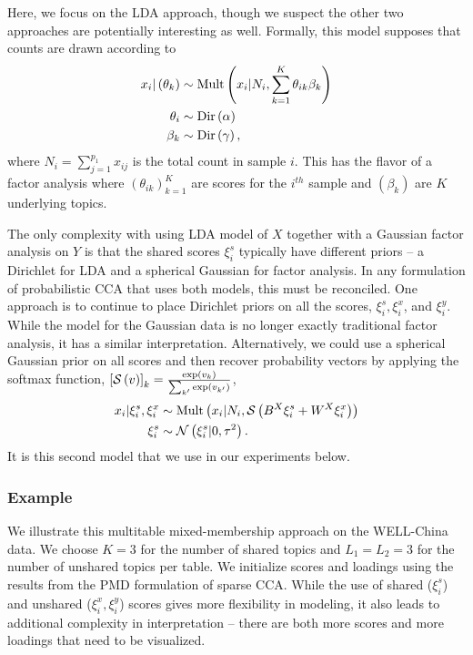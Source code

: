 \documentclass[14pt]{extarticle}
\begin{document}
Here, we focus on the LDA approach, though we suspect the other two approaches
are potentially interesting as well. Formally, this model supposes that counts
are drawn according to
\begin{align*}
  x_{i} \vert \left(\theta_{k}\right) &\sim \textnormal{Mult}\left(x_{i} \vert N_{i},
  \sum_{k = 1}^{K} \theta_{ik} \beta_{k}\right) \\
  \theta_{i} &\sim \textnormal{Dir}\left(\alpha\right)\\
  \beta_k &\sim \textnormal{Dir}\left(\gamma\right),
\end{align*}
where $N_i = \sum_{j = 1}^{p_1} x_{ij}$ is the total count in sample $i$. This
has the flavor of a factor analysis where $\left(\theta_{ik}\right)_{k =1}^{K}$
are scores for the $i^{th}$ sample and $\left(\beta_{k}\right)$ are $K$
underlying topics.

The only complexity with using LDA model of $X$ together with a Gaussian factor
analysis on $Y$ is that the shared scores $\xi_{i}^{s}$ typically have different
priors -- a Dirichlet for LDA and a spherical Gaussian for factor analysis. In
any formulation of probabilistic CCA that uses both models, this must be
reconciled. One approach is to continue to place Dirichlet priors on all the
scores, $\xi_{i}^s, \xi_{i}^x$, and $\xi_{i}^y$. While the model for the
Gaussian data is no longer exactly traditional factor analysis, it has a similar
interpretation. Alternatively, we could use a spherical Gaussian prior on all
scores and then recover probability vectors by applying the softmax function,
$\left[\mathcal{S}\left(v\right)\right]_{k} =
\frac{\operatorname{exp}\left(v_{k}\right)}{\sum_{k^{\prime}}\operatorname{exp}\left(v_{k^{\prime}}\right)}$,
\begin{align*}
  x_{i} \vert \xi_{i}^{s}, \xi_{i}^{x} &\sim \textnormal{Mult}\left(x_{i} \vert N_{i},
  \mathcal{S}\left(B^{X} \xi_{i}^{s} + W^{X} \xi_{i}^{x}\right)\right) \\
  \xi_{i}^{s} &\sim \mathcal{N}\left(\xi_i^s \vert 0, \tau^{2}\right).
\end{align*}
It is this second model that we use in our experiments below.

\subsubsection{Example}
\label{subsubsec:lda_cca_example}

We illustrate this multitable mixed-membership approach on the WELL-China data.
We choose $K = 3$ for the number of shared topics and $L_{1} = L_{2} = 3$ for
the number of unshared topics per table. We initialize scores and loadings using
the results from the PMD formulation of sparse CCA. While the use of shared
($\xi_{i}^{s}$) and unshared ($\xi_{i}^{x}, \xi_{i}^{y}$) scores gives more
flexibility in modeling, it also leads to additional complexity in
interpretation -- there are both more scores and more loadings that need to be
visualized.
\end{document}
